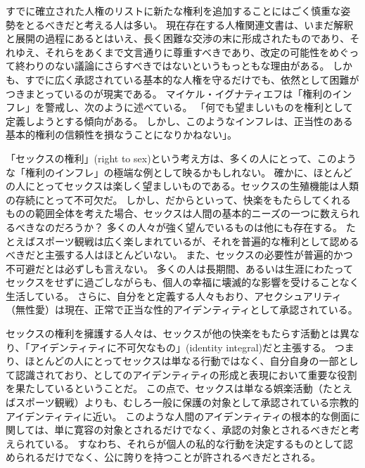 \documentclass[paper=a4,book,openany]{jlreq}
\begin{document}
すでに確立された人権のリストに新たな権利を追加することにはごく慎重な姿勢をとるべきだと考える人は多い。
現在存在する人権関連文書は、いまだ解釈と展開の過程にあるとはいえ、長く困難な交渉の末に形成されたものであり、それゆえ、それらをあくまで文言通りに尊重すべきであり、改定の可能性をめぐって終わりのない議論にさらすべきではないというもっともな理由がある。
しかも、すでに広く承認されている基本的な人権を守るだけでも、依然として困難がつきまとっているのが現実である。
マイケル・イグナティエフは「権利のインフレ」を警戒し、次のように述べている。
「何でも望ましいものを権利として定義しようとする傾向がある。
しかし、このようなインフレは、正当性のある基本的権利の信頼性を損なうことになりかねない」\citep[p.90]{ignatieff03:_human_right_polit_idolat}。

「セックスの権利」(right to sex)という考え方は、多くの人にとって、このような「権利のインフレ」の極端な例として映るかもしれない。
確かに、ほとんどの人にとってセックスは楽しく望ましいものである。セックスの生殖機能は人類の存続にとって不可欠だ。
しかし、だからといって、快楽をもたらしてくれるものの範囲全体を考えた場合、セックスは人間の基本的ニーズの一つに数えられるべきなのだろうか？  多くの人々が強く望んでいるものは他にも存在する。
たとえばスポーツ観戦は広く楽しまれているが、それを普遍的な権利として認めるべきだと主張する人はほとんどいない。
また、セックスの必要性が普遍的かつ不可避だとは必ずしも言えない。
多くの人は長期間、あるいは生涯にわたってセックスをせずに過ごしながらも、個人の幸福に壊滅的な影響を受けることなく生活している。
さらに、自分をと定義する人々もおり、アセクシュアリティ（無性愛）は現在、正常で正当な性的アイデンティティとして承認されている。

セックスの権利を擁護する人々は、セックスが他の快楽をもたらす活動とは異なり、「アイデンティティに不可欠なもの」(identity integral)だと主張する。
つまり、ほとんどの人にとってセックスは単なる行動ではなく、自分自身の一部として認識されており、としてのアイデンティティの形成と表現において重要な役割を果たしているということだ。
この点で、セックスは単なる娯楽活動（たとえばスポーツ観戦）よりも、むしろ一般に保護の対象として承認されている宗教的アイデンティティに近い。
このような人間のアイデンティティの根本的な側面に関しては、単に寛容の対象とされるだけでなく、承認の対象とされるべきだと考えられている。
すなわち、それらが個人の私的な行動を決定するものとして認められるだけでなく、公に誇りを持つことが許されるべきだとされる。
\end{document}
